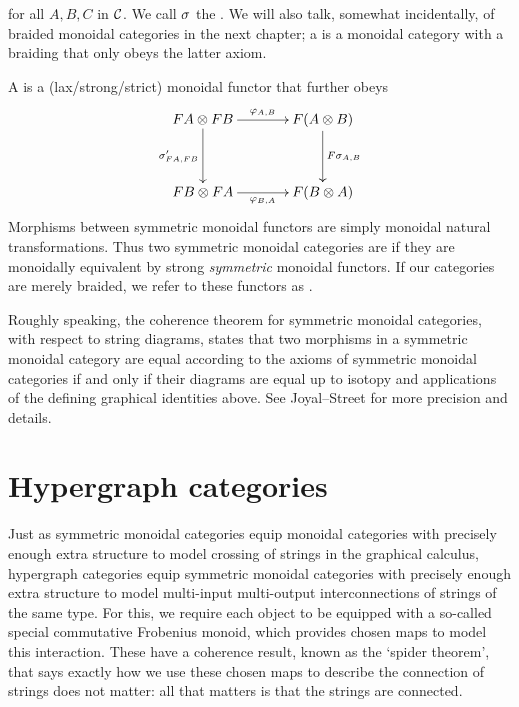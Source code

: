 for all $A,B,C$ in $\mathcal C$.  We call $\sigma$ the . We will also
talk, somewhat incidentally, of braided monoidal categories in the next
chapter; a  is a monoidal category with a
braiding that only obeys the latter axiom.

A  is a
(lax/strong/strict) monoidal functor that further obeys
\[
\xymatrixcolsep{3pc}
\xymatrixrowsep{3pc}
\xymatrix{
FA \ot FB \ar[r]^{\varphi_{A,B}} \ar[d]_{\s'_{FA,FB}} & F(A \ot B)\ar[d]^{F\s_{A,B}}\\
FB \ot FA \ar[r]_{\varphi_{B,A}} & F(B \ot A)
}
\]
Morphisms between symmetric monoidal functors are simply monoidal natural
transformations. Thus two symmetric monoidal categories are  if they are monoidally equivalent by strong
\emph{symmetric} monoidal functors. If our categories are merely braided, we
refer to these functors as .

Roughly speaking, the coherence theorem for symmetric monoidal categories, with
respect to string diagrams, states that two morphisms in a symmetric monoidal
category are equal according to the axioms of symmetric monoidal categories if
and only if their diagrams are equal up to isotopy and applications of the
defining graphical identities above. See Joyal--Street \cite[Theorem
2.3]{JS91} for more precision and details.

\section{Hypergraph categories}

Just as symmetric monoidal categories equip monoidal categories with precisely
enough extra structure to model crossing of strings in the graphical calculus,
hypergraph categories equip symmetric monoidal categories with precisely enough
extra structure to model multi-input multi-output interconnections of strings of
the same type. For this, we require each object to be equipped with a so-called
special commutative Frobenius monoid, which provides chosen maps to model this
interaction. These have a coherence result, known as the `spider theorem', that
says exactly how we use these chosen maps to describe the connection of strings
does not matter: all that matters is that the strings are connected. 

